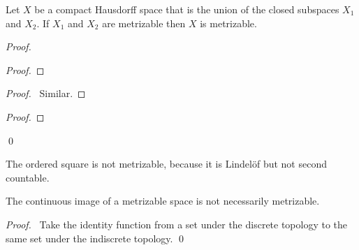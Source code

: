 \begin{proposition}
    Let $X$ be a compact Hausdorff space that is the union of the closed
    subspaces $X_1$ and $X_2$. If $X_1$ and $X_2$ are metrizable then $X$
    is metrizable.
\end{proposition}

\begin{proof}
    \pf
    \begin{proof}
    \end{proof}
    \begin{proof}
        \pf\ Similar.
    \end{proof}
    \begin{proof}
    \end{proof}
    \qed
\end{proof}

\begin{example}
    The ordered square is not metrizable, because it is Lindel\"{o}f but not second countable.
\end{example}

\begin{proposition}
    The continuous image of a metrizable space is not necessarily metrizable.
\end{proposition}

\begin{proof}
    \pf\ Take the identity function from a set under the discrete topology
    to the same set under the indiscrete topology. \qed
\end{proof}

